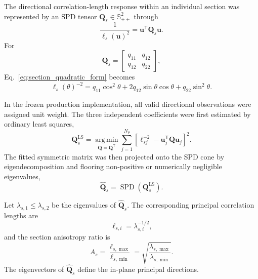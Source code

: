 \documentclass{article}
\begin{document}
The directional correlation-length response within an individual section
was represented by an SPD tensor
$\bm{Q}_{s}\in\mathbb{S}_{++}^{2}$ through
\begin{equation}
    \frac{1}{\ell_{s}(\bm{u})^{2}}
    =
    \bm{u}^{\mathsf T}
    \bm{Q}_{s}
    \bm{u}.
    \label{eq:section_quadratic_form}
\end{equation}
For
\begin{equation}
    \bm{Q}_{s}
    =
    \begin{bmatrix}
        q_{11} & q_{12}\\
        q_{12} & q_{22}
    \end{bmatrix},
    \label{eq:q2d}
\end{equation}
Eq.~\eqref{eq:section_quadratic_form} becomes
\begin{equation}
    \ell_{s}(\theta)^{-2}
    =
    q_{11}\cos^{2}\theta
    +
    2q_{12}\sin\theta\cos\theta
    +
    q_{22}\sin^{2}\theta.
    \label{eq:q2d_expanded}
\end{equation}

In the frozen production implementation, all valid directional observations
were assigned unit weight. The three independent coefficients were first
estimated by ordinary least squares,
\begin{equation}
    \bm{Q}_{s}^{\mathrm{LS}}
    =
    \underset{\bm{Q}=\bm{Q}^{\mathsf T}}{\operatorname{arg\,min}}
    \sum_{j=1}^{N_{\theta}}
    \left[
        \ell_{sj}^{-2}
        -
        \bm{u}_{j}^{\mathsf T}
        \bm{Q}
        \bm{u}_{j}
    \right]^{2}.
    \label{eq:q2d_fit}
\end{equation}
The fitted symmetric matrix was then projected onto the SPD cone by
eigendecomposition and flooring non-positive or numerically negligible
eigenvalues,
\begin{equation}
    \widehat{\bm{Q}}_{s}
    =
    \operatorname{SPD}
    \left(
        \bm{Q}_{s}^{\mathrm{LS}}
    \right).
\end{equation}

Let $\lambda_{s,1}\leq\lambda_{s,2}$ be the eigenvalues of
$\widehat{\bm{Q}}_{s}$. The corresponding principal correlation lengths are
\begin{equation}
    \ell_{s,i}
    =
    \lambda_{s,i}^{-1/2},
    \label{eq:principal_lengths_2d}
\end{equation}
and the section anisotropy ratio is
\begin{equation}
    A_{s}
    =
    \frac{\ell_{s,\max}}{\ell_{s,\min}}
    =
    \sqrt{
        \frac{\lambda_{s,\max}}{\lambda_{s,\min}}
    }.
    \label{eq:anisotropy_2d}
\end{equation}
The eigenvectors of $\widehat{\bm{Q}}_{s}$ define the in-plane principal
directions.
\end{document}
